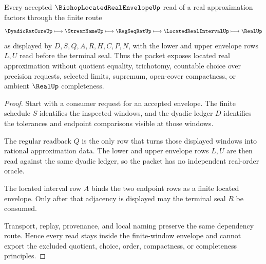 \begin{theorem}
\label{thm:bishop-located-real-envelope-finite-window-readback}
Every accepted $\BishopLocatedRealEnvelopeUp$ read of a real approximation factors through the finite route
$$
\DyadicRatCoreUp\longmapsto \StreamNameUp\longmapsto \RegSeqRatUp\longmapsto \LocatedRealIntervalUp\longmapsto \RealUp
$$
as displayed by $D,S,Q,A,R,H,C,P,N$, with the lower and upper envelope rows $L,U$ read before the terminal seal. Thus the packet exposes located real approximation without quotient equality, trichotomy, countable choice over precision requests, selected limits, supremum, open-cover compactness, or ambient $\RealUp$ completeness.
\end{theorem}
\begin{proof}
Start with a consumer request for an accepted envelope. The finite schedule $S$ identifies the inspected windows, and the dyadic ledger $D$ identifies the tolerances and endpoint comparisons visible at those windows.

The regular readback $Q$ is the only row that turns those displayed windows into rational approximation data. The lower and upper envelope rows $L,U$ are then read against the same dyadic ledger, so the packet has no independent real-order oracle.

The located interval row $A$ binds the two endpoint rows as a finite located envelope. Only after that adjacency is displayed may the terminal seal $R$ be consumed.

Transport, replay, provenance, and local naming preserve the same dependency route. Hence every read stays inside the finite-window envelope and cannot export the excluded quotient, choice, order, compactness, or completeness principles.
\end{proof}



